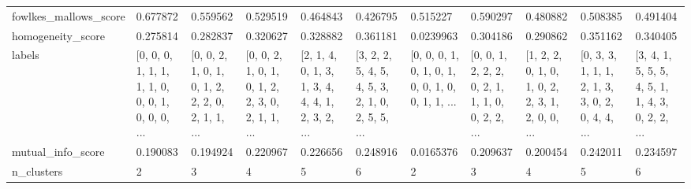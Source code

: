 \begin{tabular}{lllllllllll}
fowlkes\_mallows\_score &                                           0.677872 &                                           0.559562 &                                           0.529519 &                                           0.464843 &                                           0.426795 &                                           0.515227 &                                           0.590297 &                                           0.480882 &                                           0.508385 &                                           0.491404 \\
homogeneity\_score     &                                           0.275814 &                                           0.282837 &                                           0.320627 &                                           0.328882 &                                           0.361181 &                                          0.0239963 &                                           0.304186 &                                           0.290862 &                                           0.351162 &                                           0.340405 \\
labels                &  [0, 0, 0, 1, 1, 1, 1, 1, 0, 0, 0, 1, 0, 0, 0, ... &  [0, 0, 2, 1, 0, 1, 0, 1, 2, 2, 2, 0, 2, 1, 1, ... &  [0, 0, 2, 1, 0, 1, 0, 1, 2, 2, 3, 0, 2, 1, 1, ... &  [2, 1, 4, 0, 1, 3, 1, 3, 4, 4, 4, 1, 2, 3, 2, ... &  [3, 2, 2, 5, 4, 5, 4, 5, 3, 2, 1, 0, 2, 5, 5, ... &  [0, 0, 0, 1, 0, 1, 0, 1, 0, 0, 1, 0, 0, 1, 1, ... &  [0, 0, 1, 2, 2, 2, 0, 2, 1, 1, 1, 0, 0, 2, 2, ... &  [1, 2, 2, 0, 1, 0, 1, 0, 2, 2, 3, 1, 2, 0, 0, ... &  [0, 3, 3, 1, 1, 1, 2, 1, 3, 3, 0, 2, 0, 4, 4, ... &  [3, 4, 1, 5, 5, 5, 4, 5, 1, 1, 4, 3, 0, 2, 2, ... \\
mutual\_info\_score     &                                           0.190083 &                                           0.194924 &                                           0.220967 &                                           0.226656 &                                           0.248916 &                                          0.0165376 &                                           0.209637 &                                           0.200454 &                                           0.242011 &                                           0.234597 \\
n\_clusters            &                                                  2 &                                                  3 &                                                  4 &                                                  5 &                                                  6 &                                                  2 &                                                  3 &                                                  4 &                                                  5 &                                                  6 \\

\end{tabular}

